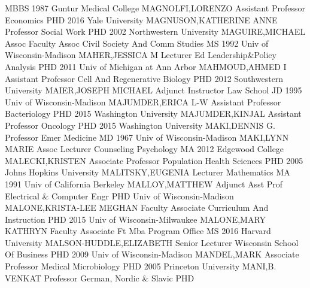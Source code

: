\documentclass[
]{article}
\begin{document}
\textbar MBBS 1987 Guntur Medical College \textbar{} 
\textbar MAGNOLFI,LORENZO \textbar Assistant Professor
\textbar Economics \textbar PHD 2016 Yale University \textbar{}
 \textbar MAGNUSON,KATHERINE ANNE \textbar Professor
\textbar Social Work \textbar PHD 2002 Northwestern University
\textbar{}  \textbar MAGUIRE,MICHAEL \textbar Assoc Faculty
Assoc \textbar Civil Society And Comm Studies \textbar MS 1992 Univ of
Wisconsin-Madison \textbar{}  \textbar MAHER,JESSICA M
\textbar Lecturer \textbar Ed Leadership\&Policy Analysis \textbar PHD
2011 Univ of Michigan at Ann Arbor \textbar{} 
\textbar MAHMOUD,AHMED I \textbar Assistant Professor \textbar Cell And
Regenerative Biology \textbar PHD 2012 Southwestern University
\textbar{}  \textbar MAIER,JOSEPH MICHAEL \textbar Adjunct
Instructor \textbar Law School \textbar JD 1995 Univ of
Wisconsin-Madison \textbar{}  \textbar MAJUMDER,ERICA L-W
\textbar Assistant Professor \textbar Bacteriology \textbar PHD 2015
Washington University \textbar{}  \textbar MAJUMDER,KINJAL
\textbar Assistant Professor \textbar Oncology \textbar PHD 2015
Washington University \textbar{}  \textbar MAKI,DENNIS G.
\textbar Professor Emer \textbar Medicine \textbar MD 1967 Univ of
Wisconsin-Madison \textbar{}  \textbar MAKI,LYNN MARIE
\textbar Assoc Lecturer \textbar Counseling Psychology \textbar MA 2012
Edgewood College \textbar{}  \textbar MALECKI,KRISTEN
\textbar Associate Professor \textbar Population Health Sciences
\textbar PHD 2005 Johns Hopkins University \textbar{} 
\textbar MALITSKY,EUGENIA \textbar Lecturer \textbar Mathematics
\textbar MA 1991 Univ of California Berkeley \textbar{} 
\textbar MALLOY,MATTHEW \textbar Adjunct Asst Prof \textbar Electrical
\& Computer Engr \textbar PHD Univ of Wisconsin-Madison \textbar{}
 \textbar MALONE,KRISTA-LEE MEGHAN \textbar Faculty
Associate \textbar Curriculum And Instruction \textbar PHD 2015 Univ of
Wisconsin-Milwaukee \textbar{}  \textbar MALONE,MARY KATHRYN
\textbar Faculty Associate \textbar Ft Mba Program Office \textbar MS
2016 Harvard University \textbar{} 
\textbar MALSON-HUDDLE,ELIZABETH \textbar Senior Lecturer
\textbar Wisconsin School Of Business \textbar PHD 2009 Univ of
Wisconsin-Madison \textbar{}  \textbar MANDEL,MARK
\textbar Associate Professor \textbar Medical Microbiology \textbar PHD
2005 Princeton University \textbar{}  \textbar MANI,B.
VENKAT \textbar Professor \textbar German, Nordic \& Slavic \textbar PHD
\end{document}
